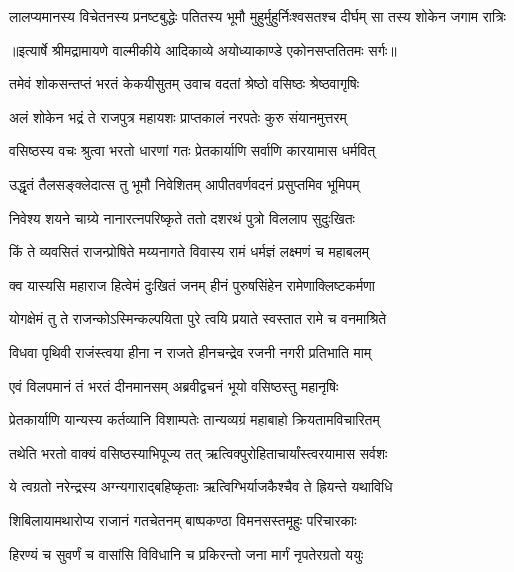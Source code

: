 \fourlineindentedshloka
{लालप्यमानस्य विचेतनस्य}
{प्रनष्टबुद्धेः पतितस्य भूमौ}
{मुहुर्मुहुर्निःश्वसतश्च दीर्घम्}
{सा तस्य शोकेन जगाम रात्रिः} %


{॥इत्यार्षे श्रीमद्रामायणे वाल्मीकीये आदिकाव्ये अयोध्याकाण्डे एकोनसप्ततितमः सर्गः॥}


\twolineshloka
{तमेवं शोकसन्तप्तं भरतं केकयीसुतम्}
{उवाच वदतां श्रेष्ठो वसिष्ठः श्रेष्ठवागृषिः} %

\twolineshloka
{अलं शोकेन भद्रं ते राजपुत्र महायशः}
{प्राप्तकालं नरपतेः कुरु संयानमुत्तरम्} %

\twolineshloka
{वसिष्ठस्य वचः श्रुत्वा भरतो धारणां गतः}
{प्रेतकार्याणि सर्वाणि कारयामास धर्मवित्} %

\twolineshloka
{उद्धृतं तैलसङ्क्लेदात्स तु भूमौ निवेशितम्}
{आपीतवर्णवदनं प्रसुप्तमिव भूमिपम्} %

\twolineshloka
{निवेश्य शयने चाग्र्ये नानारत्नपरिष्कृते}
{ततो दशरथं पुत्रो विललाप सुदुःखितः} %

\twolineshloka
{किं ते व्यवसितं राजन्प्रोषिते मय्यनागते}
{विवास्य रामं धर्मज्ञं लक्ष्मणं च महाबलम्} %

\twolineshloka
{क्व यास्यसि महाराज हित्वेमं दुःखितं जनम्}
{हीनं पुरुषसिंहेन रामेणाक्लिष्टकर्मणा} %

\twolineshloka
{योगक्षेमं तु ते राजन्कोऽस्मिन्कल्पयिता पुरे}
{त्वयि प्रयाते स्वस्तात रामे च वनमाश्रिते} %

\twolineshloka
{विधवा पृथिवी राजंस्त्वया हीना न राजते}
{हीनचन्द्रेव रजनी नगरी प्रतिभाति माम्} %

\twolineshloka
{एवं विलपमानं तं भरतं दीनमानसम्}
{अब्रवीद्वचनं भूयो वसिष्ठस्तु महानृषिः} %

\twolineshloka
{प्रेतकार्याणि यान्यस्य कर्तव्यानि विशाम्पतेः}
{तान्यव्यग्रं महाबाहो क्रियतामविचारितम्} %

\twolineshloka
{तथेति भरतो वाक्यं वसिष्ठस्याभिपूज्य तत्}
{ऋत्विक्पुरोहिताचार्यांस्त्वरयामास सर्वशः} %

\twolineshloka
{ये त्वग्रतो नरेन्द्रस्य अग्न्यगाराद्बहिष्कृताः}
{ऋत्विग्भिर्याजकैश्चैव ते ह्रियन्ते यथाविधि} %

\twolineshloka
{शिबिलायामथारोप्य राजानं गतचेतनम्}
{बाष्पकण्ठा विमनसस्तमूहुः परिचारकाः} %

\twolineshloka
{हिरण्यं च सुवर्णं च वासांसि विविधानि च}
{प्रकिरन्तो जना मार्गं नृपतेरग्रतो ययुः} %

